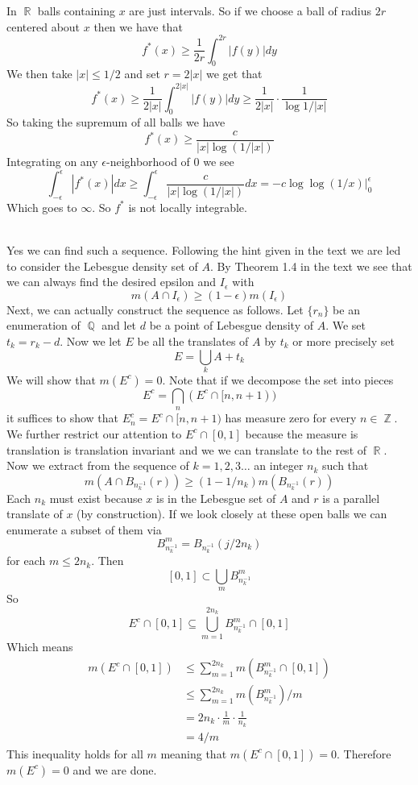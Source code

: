 \documentclass{article}
\DeclareMathOperator{\Z}{\mathbb{Z}}
\DeclareMathOperator{\Q}{\mathbb{Q}}
\DeclareMathOperator{\R}{\mathbb{R}}
\newcommand{\problem}[1]{\noindent{\textbf{Problem #1}}\\}
\newcommand{\problempart}[1]{\noindent{\textbf{(#1)}}}
\begin{document}
\problempart{b} In $\R$ balls containing $x$ are just intervals. So if we choose a ball of radius $2r$ centered about $x$ then we have that
\[
f^*(x) \geq \frac{1}{2r}\int_0^{2r}|f(y)|dy
\]
We then take $|x| \leq 1/2$ and set $r = 2|x|$ we get that
\[
f^*(x) \geq \frac{1}{2|x|}\int_0^{2|x|}|f(y)|dy \geq \frac{1}{2|x|} \cdot \frac{1}{\log 1/|x|}
\]
So taking the supremum of all balls we have 
\[
f^*(x) \geq \frac{c}{|x|\log(1/|x|)}
\]
Integrating on any $\epsilon$-neighborhood of 0 we see
\[
\int_{-\epsilon}^\epsilon |f^*(x)|dx \geq \int_{-\epsilon}^\epsilon \frac{c}{|x|\log(1/|x|)}dx = -c\log\log(1/x)\Big |_0^\epsilon
\]
Which goes to $\infty$. So $f^*$ is not locally integrable. 

\problem{3.5.8} Yes we can find such a sequence. Following the hint given in the text we are led to consider the Lebesgue density set of $A$. By  Theorem 1.4 in the text we see that we can always find the desired epsilon and $I_\epsilon$ with
\[
m(A \cap I_\epsilon) \geq (1-\epsilon)m(I_\epsilon)
\] 
Next, we can actually construct the sequence as follows. Let $\{r_n\}$ be an enumeration of $\Q$ and let $d$ be a point of Lebesgue density of   $A$. We set $t_k = r_k - d$. Now we let $E$ be all the translates of $A$ by $t_k$ or more precisely set
\[
E = \bigcup_{k} A + t_k
\]
We will show that $m(E^c) = 0$. Note that if we decompose the set into pieces
\[
E^c = \bigcap_{n} (E^c \cap [n,n+1))
\]
it suffices to show that $E^c_n = E^c \cap [n,n+1)$ has measure zero for every $n \in \Z$. We further restrict our attention to $E^c \cap [0,1]$ because the measure is translation is translation invariant and we we can translate to the rest of $\R$. \\
\indent Now we extract from the sequence of $k = 1,2,3\ldots$ an integer $n_k$ such that 
\[
m(A \cap B_{n_k^{-1}}(r)) \geq (1 - 1/n_k)m(B_{n_k^{-1}}(r)) 
\] 
Each $n_k$ must exist because $x$ is in the Lebesgue set of $A$ and $r$ is a parallel translate of $x$ (by construction). If we look closely at these open balls we can enumerate a subset of them via
\[
B^m_{n^{-1}_k} = B_{n^{-1}_k}(j/2n_k) 
\]
for each $m \leq 2n_k$. Then 
\[
[0,1] \subset \bigcup_{m} B^m_{n^{-1}_k}
\]
So 
\[
E^c \cap [0,1] \subseteq \bigcup_{m=1}^{2n_k} B_{n_k^{-1}}^{m} \cap [0,1]
\]
Which means
\begin{align*}
m(E^c\cap [0,1]) &\leq \sum_{m=1}^{2n_k} m(B_{n_k^{-1}}^{m} \cap [0,1]) \\
&\leq \sum_{m=1}^{2n_k} m(B_{n_k^{-1}}^{m})/m \\
&= 2n_k \cdot \frac{1}{m}\cdot \frac{1}{n_k} \\
&= 4/m
\end{align*}
This inequality holds for all $m$ meaning that $m(E^c \cap [0,1]) = 0$. Therefore $m(E^c) = 0$ and we are done. 
\end{document}
